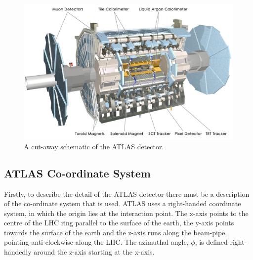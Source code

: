 \begin{figure}[!ht]
  \begin{center}
    \includegraphics[width=1\linewidth, angle=0]{figs/Detector/ATLAS_schem.jpg}
  \end{center}
  \caption{ A cut-away schematic of the ATLAS detector.}
  \label{fig:det-ATLAS_schem}
\end{figure}



\subsection{ATLAS Co-ordinate System}

Firstly, to describe the detail of the ATLAS detector there must be a description of the co-ordinate system that is used.
ATLAS uses a right-handed coordinate system, in which the origin lies at the interaction point.
The x-axis points to the centre of the LHC ring parallel to the surface of the earth,
the y-axis points towards the surface of the earth
and the z-axis runs along the beam-pipe, pointing anti-clockwise along the LHC.
The azimuthal angle, $\phi$, is defined right-handedly around the z-axis starting at the x-axis.
\\

